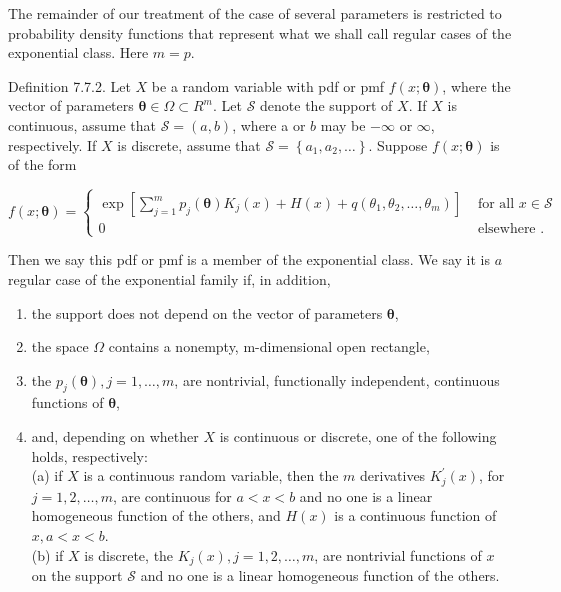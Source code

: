 The remainder of our treatment of the case of several parameters is restricted to probability density functions that represent what we shall call regular cases of the exponential class. Here $m=p$.

Definition 7.7.2. Let $X$ be a random variable with pdf or pmf $f(x ; \boldsymbol{\theta})$, where the vector of parameters $\boldsymbol{\theta} \in \Omega \subset R^{m}$. Let $\mathcal{S}$ denote the support of $X$. If $X$ is continuous, assume that $\mathcal{S}=(a, b)$, where a or $b$ may be $-\infty$ or $\infty$, respectively. If $X$ is discrete, assume that $\mathcal{S}=\left\{a_{1}, a_{2}, \ldots\right\}$. Suppose $f(x ; \boldsymbol{\theta})$ is of the form

\[
f(x ; \boldsymbol{\theta})= \begin{cases}\exp \left[\sum_{j=1}^{m} p_{j}(\boldsymbol{\theta}) K_{j}(x)+H(x)+q\left(\theta_{1}, \theta_{2}, \ldots, \theta_{m}\right)\right] & \text { for all } x \in \mathcal{S}  \tag{7.7.2}\\ 0 & \text { elsewhere } .\end{cases}
\]

Then we say this pdf or pmf is a member of the exponential class. We say it is $a$ regular case of the exponential family if, in addition,

\begin{enumerate}
  \item the support does not depend on the vector of parameters $\boldsymbol{\theta}$,
  \item the space $\Omega$ contains a nonempty, m-dimensional open rectangle,
  \item the $p_{j}(\boldsymbol{\theta}), j=1, \ldots, m$, are nontrivial, functionally independent, continuous functions of $\boldsymbol{\theta}$,
  \item and, depending on whether $X$ is continuous or discrete, one of the following holds, respectively:\\
(a) if $X$ is a continuous random variable, then the $m$ derivatives $K_{j}^{\prime}(x)$, for $j=1,2, \ldots, m$, are continuous for $a<x<b$ and no one is a linear homogeneous function of the others, and $H(x)$ is a continuous function of $x, a<x<b$.\\
(b) if $X$ is discrete, the $K_{j}(x), j=1,2, \ldots, m$, are nontrivial functions of $x$ on the support $\mathcal{S}$ and no one is a linear homogeneous function of the others.
\end{enumerate}

